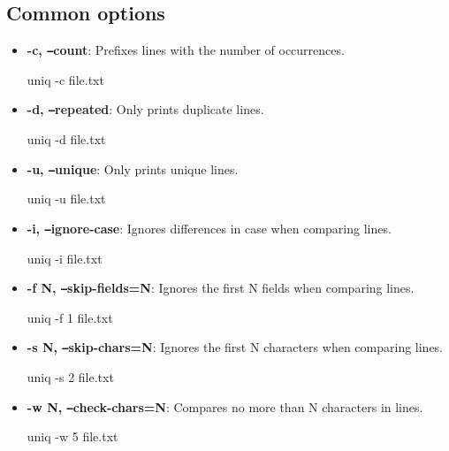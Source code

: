 \documentclass{report}
\begin{document}
    \subsection{Common options}
    \begin{itemize}
        \item \textbf{-c, \texttt{--}count}:  Prefixes lines with the number of occurrences.
            \bigbreak \noindent 
            \begin{bashcode}
            uniq -c file.txt
            \end{bashcode}
        \item \textbf{-d, \texttt{--}repeated}: Only prints duplicate lines.
            \bigbreak \noindent 
            \begin{bashcode}
            uniq -d file.txt
            \end{bashcode}
        \item \textbf{-u, \texttt{--}unique}: Only prints unique lines.
            \bigbreak \noindent 
            \begin{bashcode}
            uniq -u file.txt
            \end{bashcode}
        \item \textbf{-i, \texttt{--}ignore-case}: Ignores differences in case when comparing lines.
            \bigbreak \noindent 
            \begin{bashcode}
            uniq -i file.txt
            \end{bashcode}
        \item \textbf{-f N, \texttt{--}skip-fields=N}: Ignores the first N fields when comparing lines.
            \bigbreak \noindent 
            \begin{bashcode}
            uniq -f 1 file.txt
            \end{bashcode}
        \item \textbf{-s N, \texttt{--}skip-chars=N}: Ignores the first N characters when comparing lines.
            \bigbreak \noindent 
            \begin{bashcode}
            uniq -s 2 file.txt
            \end{bashcode}
        \item \textbf{-w N, \texttt{--}check-chars=N}: Compares no more than N characters in lines.
            \bigbreak \noindent 
            \begin{bashcode}
            uniq -w 5 file.txt
            \end{bashcode}
    \end{itemize}
\end{document}
